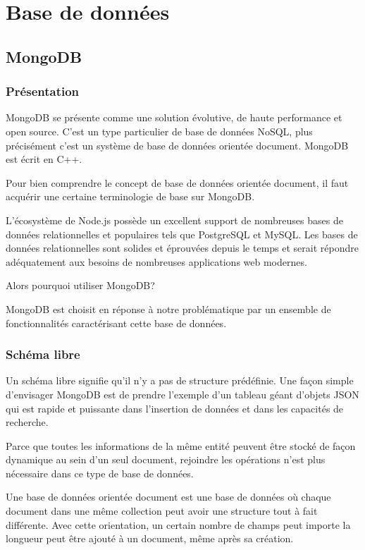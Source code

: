 \chapter{Base de données}

\section{MongoDB}
\label{ch:mongodb}

\subsection{Présentation}

MongoDB se présente comme une solution évolutive, de haute performance et open source. C’est un type particulier de base de données NoSQL, plus précisément c’est un système de base de données orientée document. MongoDB est écrit en C++.

Pour bien comprendre le concept de base de données orientée document, il faut acquérir une certaine terminologie de base sur MongoDB. 

L’écosystème de Node.js possède un excellent support de nombreuses bases de données relationnelles et populaires tels que PostgreSQL et MySQL. Les bases de données relationnelles sont solides et éprouvées depuis le temps et serait répondre adéquatement aux besoins de nombreuses applications web modernes.

Alors pourquoi utiliser MongoDB? 
 
MongoDB est choisit en réponse à notre problématique par un ensemble de fonctionnalités caractérisant cette base de données. 

\subsection{Schéma libre}

Un schéma libre signifie qu'il n'y a pas de structure prédéfinie. Une façon simple d’envisager MongoDB est de prendre l’exemple d’un tableau géant d’objets JSON qui est rapide et puissante dans l’insertion de données et dans les capacités de recherche.

Parce que toutes les informations de la même entité peuvent être stocké de façon dynamique au sein d’un seul document, rejoindre les opérations n’est plus nécessaire dans ce type de base de données.

Une base de données orientée document est une base de données où chaque document dans une même collection peut avoir une structure tout à fait différente. Avec cette orientation, un certain nombre de champs peut importe la longueur peut être ajouté à un document, même après sa création.

